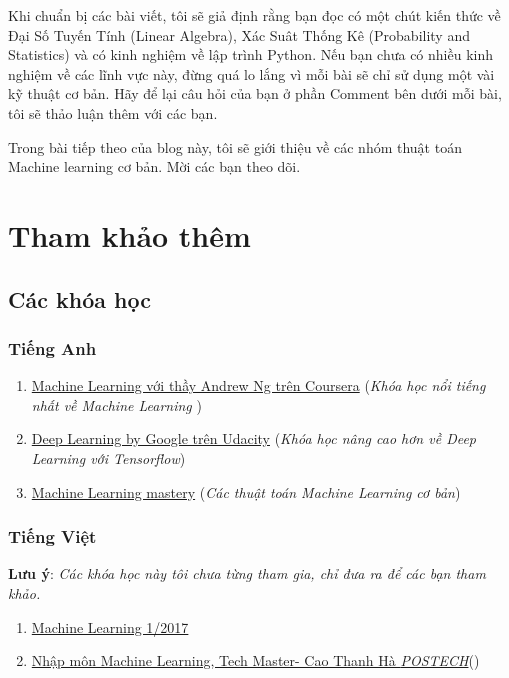 Khi chuẩn bị các bài viết, tôi sẽ giả định rằng bạn đọc có một chút kiến thức về Đại Số Tuyến Tính (Linear Algebra), Xác Suât Thống Kê (Probability and Statistics) và có kinh nghiệm về lập trình Python. Nếu bạn chưa có nhiều kinh nghiệm về các lĩnh vực này, đừng quá lo lắng vì mỗi bài sẽ chỉ sử dụng một vài kỹ thuật cơ bản. Hãy để lại câu hỏi của bạn ở phần Comment bên dưới mỗi bài, tôi sẽ thảo luận thêm với các bạn.

Trong bài tiếp theo của blog này, tôi sẽ giới thiệu về các nhóm thuật toán Machine learning cơ bản. Mời các bạn theo dõi. 

\section{Tham khảo thêm}
\subsection{Các khóa học}
\subsubsection{Tiếng Anh}
\begin{enumerate}
	\item \href{https://www.coursera.org/learn/machine-learning}{Machine Learning với thầy Andrew Ng trên Coursera} ({\it Khóa học nổi tiếng nhất về Machine Learning })

	\item \href{https://www.udacity.com/course/deep-learning--ud730}{Deep Learning by Google trên Udacity} ({\it Khóa học nâng cao hơn về Deep Learning với Tensorflow})


	\item \href{http://machinelearningmastery.com/}{Machine Learning mastery} ({\it Các thuật toán Machine Learning cơ bản})
\end{enumerate}

\subsubsection{Tiếng Việt}
{\bf Lưu ý}: {\it Các khóa học này tôi chưa từng tham gia, chỉ đưa ra để các bạn tham khảo.}
\begin{enumerate}
	\item \href{http://tuanvannguyen.blogspot.com/2016/12/cap-nhat-khoa-hoc-ve-machine-learning.html}{Machine Learning 1/2017}


	\item \href{https://techmaster.vn/khoa-hoc/25511/machine-learning-co-ban}{Nhập môn Machine Learning, Tech Master- Cao Thanh Hà {\it POSTECH}}() 

\end{enumerate}

